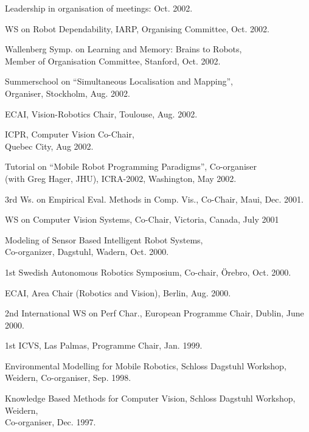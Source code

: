 \documentclass{article}
\begin{document}
\begin{cv}
\begin{cvlist}{Leadership in organisation of meetings:}
		\cftdotfill{\cftdotsep} Oct. 2002.
		\item WS on Robot Dependability, IARP, Organising Committee,
		\cftdotfill{\cftdotsep} Oct. 2002.
		\item Wallenberg Symp. on Learning and Memory: Brains to Robots,\\
		Member of Organisation Committee, Stanford, \cftdotfill{\cftdotsep} Oct. 2002.
		\item Summerschool on ``Simultaneous Localisation and Mapping'', \\Organiser,
		Stockholm, \cftdotfill{\cftdotsep}Aug. 2002.
		\item ECAI, Vision-Robotics Chair, Toulouse, \cftdotfill{\cftdotsep} Aug.
		2002.
		\item ICPR, Computer Vision Co-Chair,\\ Quebec City, \cftdotfill{\cftdotsep}
		Aug 2002.
		\item Tutorial on ``Mobile Robot Programming Paradigms'', Co-organiser\\ (with
		Greg Hager, JHU), ICRA-2002, Washington, \cftdotfill{\cftdotsep}May 2002.
		\item 3rd Ws. on Empirical Eval. Methods in Comp. Vis., Co-Chair, Maui,
		\cftdotfill{\cftdotsep} Dec. 2001.
		\item WS on Computer Vision Systems, Co-Chair, Victoria,
		Canada,\cftdotfill{\cftdotsep} July 2001
		\item Modeling of Sensor Based Intelligent Robot Systems,\\
		Co-organizer, Dagstuhl, Wadern, \cftdotfill{\cftdotsep} Oct. 2000.
		\item 1st Swedish Autonomous Robotics Symposium, Co-chair, \"Orebro,
		\cftdotfill{\cftdotsep}Oct. 2000.
		\item ECAI, Area Chair (Robotics and Vision), Berlin, \cftdotfill{\cftdotsep}
		Aug. 2000.
		\item 2nd International WS on Perf Char., European Programme Chair,
		Dublin,\cftdotfill{\cftdotsep} June 2000.
		\item 1st ICVS, Las Palmas, Programme Chair, \cftdotfill{\cftdotsep} Jan.
		1999.
		\item Environmental Modelling for Mobile Robotics, Schloss Dagstuhl
		Workshop,\\ Weidern, Co-organiser, \cftdotfill{\cftdotsep} Sep. 1998.
		\item Knowledge Based Methods for Computer Vision, Schloss Dagstuhl Workshop,
		Weidern,\\ Co-organiser, \cftdotfill{\cftdotsep} Dec. 1997.

\end{cvlist}
\end{cv}
\end{document}
